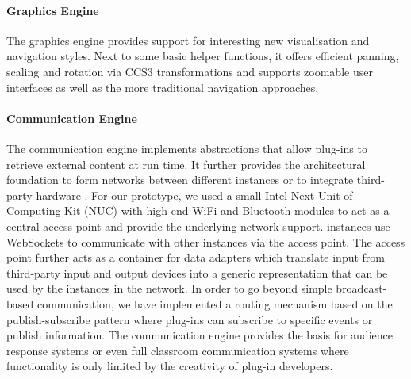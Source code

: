      \paragraph{Graphics Engine} The graphics engine provides support for
      interesting new visualisation and navigation styles. Next to some basic
      helper functions, it offers efficient panning, scaling and rotation via
      CCS3 transformations and supports zoomable user interfaces as well as the
      more traditional navigation approaches.

     \paragraph{Communication Engine} The communication engine implements
      abstractions that allow plug-ins to retrieve external content at run
      time. It further provides the architectural foundation to form networks
      between different \mxp instances or to integrate third-party hardware
      \citep{roels-2}. For our \mxp prototype, we used a small Intel Next Unit
      of Computing Kit (NUC) with high-end WiFi and Bluetooth modules to act as
      a central access point and provide the underlying network support. \mxp
      instances use WebSockets to communicate with other \mxp instances via the
      access point. The access point further acts as a container for data
      adapters which translate input from third-party input and output devices
      into a generic representation that can be used by the \mxp instances in
      the network. In order to go beyond simple broadcast-based communication,
      we have implemented a routing mechanism based on the publish-subscribe
      pattern where plug-ins can subscribe to specific events or publish
      information. The communication engine provides the basis for audience
      response systems \citep{roels-2} or even full classroom communication
      systems where functionality is only limited by the creativity of plug-in
      developers.

